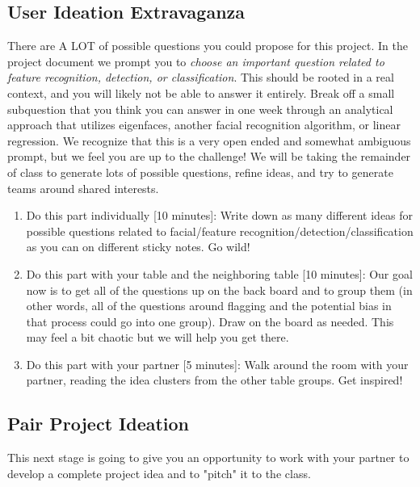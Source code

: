 \subsection{User Ideation Extravaganza}

There are A LOT of possible questions you could propose for this project. In the project document we prompt you to \textit{choose an important question related to feature recognition, detection, or classification}. This should be rooted in a real context, and you will likely not be able to answer it entirely. Break off a small subquestion that you think you can answer in one week through an analytical approach that utilizes eigenfaces, another facial recognition algorithm, or linear regression. We recognize that this is a very open ended and somewhat ambiguous prompt, but we feel you are up to the challenge! We will be taking the remainder of class to generate lots of possible questions, refine ideas, and try to generate teams around shared interests.

\begin{prob}
\begin{enumerate}
\item Do this part individually [10 minutes]: Write down as many different ideas for possible questions related to facial/feature recognition/detection/classification as you can on different sticky notes. Go wild!
\item Do this part with your table and the neighboring table [10 minutes]: Our goal now is to get all of the questions up on the back board and to group them (in other words, all of the questions around flagging and the potential bias in that process could go into one group). Draw on the board as needed. This may feel a bit chaotic but we will help you get there.
\item Do this part with your partner [5 minutes]: Walk around the room with your partner, reading the idea clusters from the other table groups. Get inspired! 
\end{enumerate}
\end{prob}


\subsection{Pair Project Ideation}
This next stage is going to give you an opportunity to work with your partner to develop a complete project idea and to "pitch" it to the class. 

